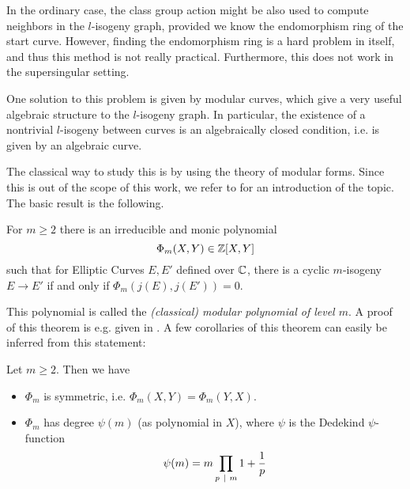 In the ordinary case, the class group action might be also used to compute neighbors in the $l$-isogeny graph, provided we know the endomorphism ring of the start curve.
However, finding the endomorphism ring is a hard problem in itself, and thus this method is not really practical.
Furthermore, this does not work in the supersingular setting.

One solution to this problem is given by modular curves, which give a very useful algebraic structure to the $l$-isogeny graph.
In particular, the existence of a nontrivial $l$-isogeny between curves is an algebraically closed condition, i.e. is given by an algebraic curve.

The classical way to study this is by using the theory of modular forms.
Since this is out of the scope of this work, we refer to \cite[§11]{cox_primes_of_form} for an introduction of the topic.
The basic result is the following.
\begin{theorem}
    \label{prop:complex_mod_poly}
    For $m \geq 2$ there is an irreducible and monic polynomial
    \begin{equation*}
        \Phi_m(X, Y) \in \mathbb{Z}[X, Y]
    \end{equation*}
    such that for Elliptic Curves $E, E'$ defined over $\mathbb{C}$, there is a cyclic $m$-isogeny $E \to E'$ if and only if $\Phi_m(j(E), j(E')) = 0$.
\end{theorem}
This polynomial is called the \emph{(classical) modular polynomial of level $m$}.
A proof of this theorem is e.g. given in \cite[Thm~11.18]{cox_primes_of_form}.
A few corollaries of this theorem can easily be inferred from this statement:
\begin{corollary}
    Let $m \geq 2$. Then we have
    \begin{itemize}
        \item $\Phi_m$ is symmetric, i.e. $\Phi_m(X, Y) = \Phi_m(Y, X)$.
        \item $\Phi_m$ has degree $\psi(m)$ (as polynomial in $X$), where $\psi$ is the Dedekind $\psi$-function
        \begin{equation*}
            \psi(m) = m \prod_{p \ \mid \  m} 1 + \frac 1 p
        \end{equation*}
    \end{itemize}
\end{corollary}
